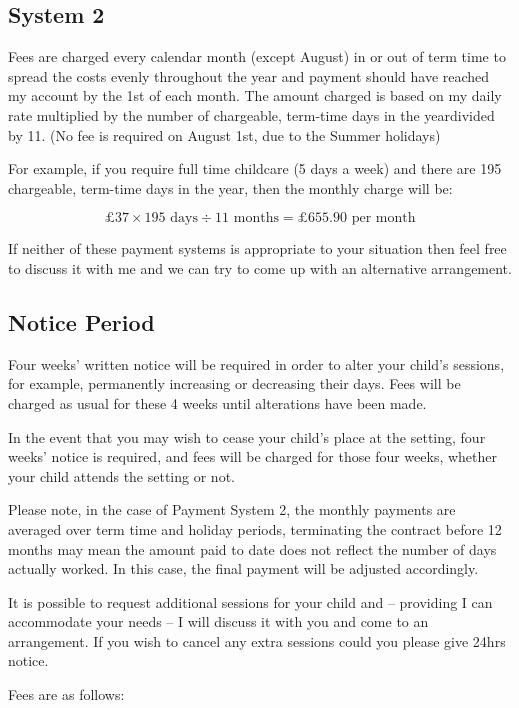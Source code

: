 \subsection{System 2}

Fees are charged every calendar month (except August) in or out of term time to spread the costs evenly throughout the year and payment should have reached my account by the 1st of each month. The amount charged is based on my daily rate multiplied by the number of chargeable, term-time days in the year\footnotemark[1] divided by 11. (No fee is required on August 1st, due to the Summer holidays) 

For example, if you require full time childcare (5 days a week) and there are 195 chargeable, term-time days in the year, then the monthly charge will be:

$$£37 \times 195 \text{ days} \div 11 \text{ months} = £655.90 \text{ per month}$$

If neither of these payment systems is appropriate to your situation then feel free to discuss it with me and we can try to come up with an alternative arrangement.

\subsection{Notice Period}

Four weeks' written notice will be required in order to alter your child's sessions, for example, permanently increasing or decreasing their days. Fees will be charged as usual for these 4 weeks until alterations have been made. 

In the event that you may wish to cease your child's place at the setting, four weeks' notice is required, and fees will be charged for those four weeks, whether your child attends the setting or not.

Please note, in the case of Payment System 2, the monthly payments are averaged over term time and holiday periods, terminating the contract before 12 months may mean the amount paid to date does not reflect the number of days actually worked. In this case, the final payment will be adjusted accordingly.

It is possible to request additional sessions for your child and – providing I can accommodate your needs – I will discuss it with you and come to an arrangement. If you wish to cancel any extra sessions could you please give 24hrs notice.

Fees are as follows:

